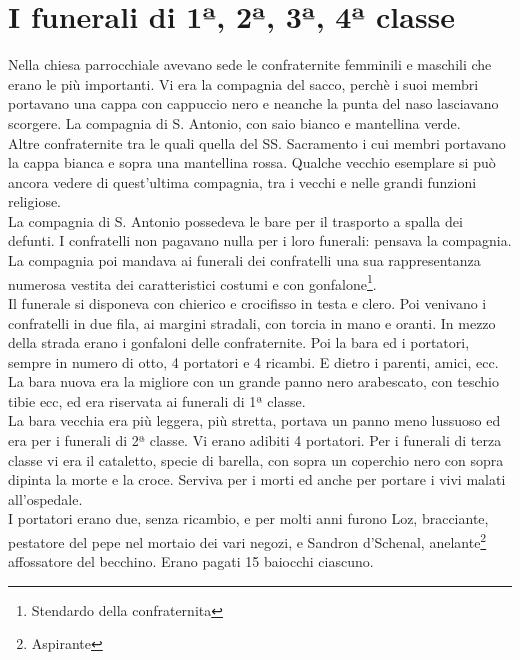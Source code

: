 \documentclass[10pt]{memoir} %
\begin{document}

\chapter{I funerali di 1ª, 2ª, 3ª, 4ª classe}
Nella chiesa parrocchiale avevano sede le confraternite femminili e maschili che erano le più importanti. Vi era la compagnia del sacco, perchè i suoi membri portavano una cappa con cappuccio nero e neanche la punta del naso lasciavano scorgere. La compagnia di S. Antonio, con saio bianco e mantellina verde.	\\
Altre confraternite tra le quali quella del SS. Sacramento i cui membri portavano la cappa bianca e sopra una mantellina rossa. Qualche vecchio esemplare si può ancora vedere di quest'ultima compagnia, tra i vecchi e nelle grandi funzioni religiose.\\
La compagnia di S. Antonio possedeva le bare per il trasporto a spalla dei defunti. I confratelli non pagavano nulla per i loro funerali: pensava la compagnia. La compagnia poi mandava ai funerali dei confratelli una sua rappresentanza numerosa vestita dei caratteristici costumi e con gonfalone\footnote{Stendardo della confraternita}.\\
Il funerale si disponeva con chierico e crocifisso in testa e clero. Poi venivano i confratelli in due fila, ai margini stradali, con torcia in mano e oranti. In mezzo della strada erano i gonfaloni delle confraternite. Poi la bara ed i portatori, sempre in numero di otto, 4 portatori e 4 ricambi. E dietro i parenti, amici, ecc. La bara nuova era la migliore con un grande panno nero arabescato, con teschio tibie ecc, ed era riservata ai funerali di 1ª classe. \\
La bara vecchia era più leggera, più stretta, portava un panno meno lussuoso ed era per i funerali di 2ª classe. Vi erano adibiti 4 portatori. Per i funerali di terza classe vi era il cataletto, specie di barella, con sopra un coperchio nero con sopra dipinta la morte e la croce. Serviva per i morti ed anche per portare i vivi malati all'ospedale.\\
I portatori erano due, senza ricambio, e per molti anni furono Loz, bracciante, pestatore del pepe nel mortaio dei vari negozi, e Sandron d'Schenal, anelante\footnote{Aspirante} affossatore del becchino. Erano pagati 15 baiocchi ciascuno.\\
\end{document}
